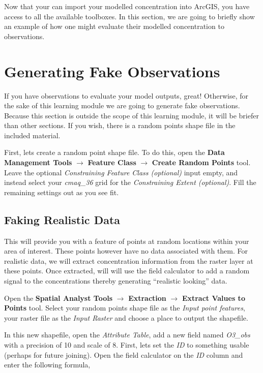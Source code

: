 Now that your can import your modelled concentration into ArcGIS, you
have access to all the available toolboxes.  In this section, we are
going to briefly show an example of how one might evaluate their
modelled concentration to observations.

\section{Generating Fake Observations}

If you have observations to evaluate your model outputs, great!
Otherwise, for the sake of this learning module we are going to
generate fake observations.  Because this section is outside the scope
of this learning module, it will be briefer than other sections.  If
you wish, there is a random points shape file in the included
material.

First, lets create a random point shape file.  To do this, open the
\textbf{Data Management Tools} $\rightarrow$ \textbf{Feature Class}
$\rightarrow$ \textbf{Create Random Points} tool.  Leave the optional
\emph{Constraining Feature Class (optional)} input empty, and instead
select your \emph{cmaq\_36} grid for the \emph{Constraining Extent
(optional)}.  Fill the remaining settings out as you see fit.

\subsection{Faking Realistic Data}
\label{faking_data}

This will provide you with a feature of points at random locations
within your area of interest.  These points however have no
data associated with them.  For realistic data, we will extract
concentration information from the raster layer at these points.
Once extracted, will will use the field calculator to add a random
signal to the concentrations thereby generating ``realistic looking''
data.

Open the \textbf{Spatial Analyst Tools} $\rightarrow$
\textbf{Extraction} $\rightarrow$ \textbf{Extract Values to Points}
tool.  Select your random points shape file as the \emph{Input point
features}, your raster file as the \emph{Input Raster} and choose a
place to output the shapefile.

In this new shapefile, open the \emph{Attribute Table}, add a new
field named \emph{O3\_obs} with a precision of 10 and scale of 8.
First, lets set the \emph{ID} to something usable (perhaps for future
joining). Open the field calculator on the \emph{ID} column and enter
the following formula,

